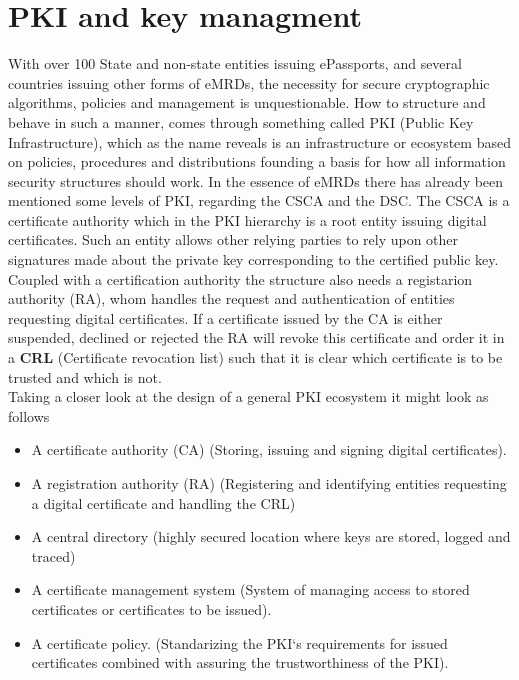 \documentclass[12pt,
               a4paper,
               article,
               oneside,
               oldfontcommands,
               english]{memoir}
\begin{document}
\section*{PKI and key managment}
With over 100 State and non-state entities issuing ePassports, and several countries issuing other forms of eMRDs, the necessity for secure cryptographic algorithms, policies and management is unquestionable. How to structure and behave in such a manner, comes through something called PKI (Public Key Infrastructure), which as the name reveals is an infrastructure or ecosystem based on policies, procedures and distributions founding a basis for how all information security structures should work. In the essence of eMRDs there has already been mentioned some levels of PKI, regarding the CSCA and the DSC. The CSCA is a certificate authority which in the PKI hierarchy is a root entity issuing digital certificates. Such an entity allows other relying parties to rely upon other signatures made about the private key corresponding to the certified public key. Coupled with a certification authority the structure also needs a registarion authority (RA), whom handles the request and authentication of entities requesting digital certificates. If a certificate issued by the CA is either suspended, declined or rejected the RA will revoke this certificate and order it in a \textbf{CRL} (Certificate revocation list) such that it is clear which certificate is to be trusted and which is not. 
\vspace{4mm}\\
Taking a closer look at the design of a general PKI ecosystem it might look as follows\cite{PKI}
\begin{itemize}
\centering
	\item A certificate authority (CA) (Storing, issuing and signing digital certificates).
 	 \item A registration authority (RA) (Registering and identifying entities requesting a digital certificate and handling the CRL)
 	 \item A central directory (highly secured location where keys are stored, logged and traced)
 	\item A certificate management system (System of managing access to stored certificates or certificates to be issued).
 	\item A certificate policy. (Standarizing the PKI`s requirements for issued certificates combined with assuring the trustworthiness of the PKI).
\end{itemize}
\end{document}
